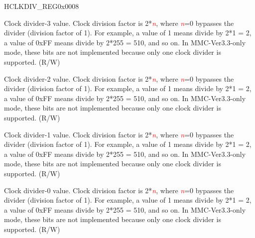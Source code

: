 \begin{register}{H}{CLKDIV\_REG}{0x0008}\label{regdesc:CLKDIVREG}
%
%
%
%
\regnewline%
\begin{regdesc}\begin{reglist}
\item [CLK\_DIVIDER3]Clock divider-3 value. Clock division factor is 2*\textcolor{red}{\it{n}}, where \textcolor{red}{\it{n}}=0 bypasses the divider (division factor of 1). For example, a value of 1 means divide by 2*1 = 2, a value of 0xFF means divide by 2*255 = 510, and so on. In MMC-Ver3.3-only mode, these bits are not implemented because only one clock divider is supported. (R/W)
\item [CLK\_DIVIDER2]Clock divider-2 value. Clock division factor is 2*\textcolor{red}{\it{n}}, where \textcolor{red}{\it{n}}=0 bypasses the divider (division factor of 1). For example, a value of 1 means divide by 2*1 = 2, a value of 0xFF means divide by 2*255 = 510, and so on. In MMC-Ver3.3-only mode, these bits are not implemented because only one clock divider is supported. (R/W)
\item [CLK\_DIVIDER1]Clock divider-1 value. Clock division factor is 2*\textcolor{red}{\it{n}}, where \textcolor{red}{\it{n}}=0 bypasses the divider (division factor of 1). For example, a value of 1 means divide by 2*1 = 2, a value of 0xFF means divide by 2*255 = 510, and so on. In MMC-Ver3.3-only mode, these bits are not implemented because only one clock divider is supported. (R/W)
\item [CLK\_DIVIDER0]Clock divider-0 value. Clock division factor is 2*\textcolor{red}{\it{n}}, where \textcolor{red}{\it{n}}=0 bypasses the divider (division factor of 1). For example, a value of 1 means divide by 2*1 = 2, a value of 0xFF means divide by 2*255 = 510, and so on. In MMC-Ver3.3-only mode, these bits are not implemented because only one clock divider is supported. (R/W)
\end{reglist}\end{regdesc}
\end{register}

